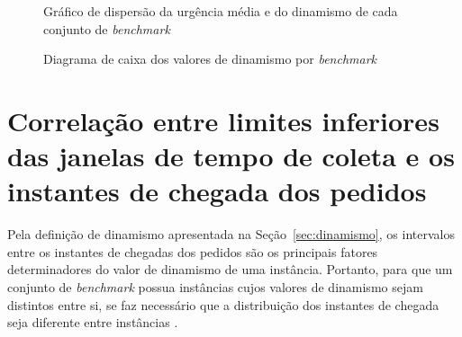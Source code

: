 \begin{figure}[H]
    \centering
    \caption{Gráfico de dispersão da urgência média e do dinamismo de cada 
    conjunto de \textit{benchmark}}
    \label{fig:scatterplot_instance_planing_horizon}
\end{figure}

\begin{figure}[H]
    \centering
    \caption{Diagrama de caixa dos valores de dinamismo por \textit{benchmark}}
    \label{fig:dynamism_boxplot_planing_horizon}
\end{figure}





\section{Correlação entre limites inferiores das janelas de tempo de coleta e
os instantes de chegada dos pedidos}

Pela definição de dinamismo apresentada na Seção~\ref{sec:dinamismo}, os 
intervalos entre os instantes de chegadas dos pedidos são os principais fatores
determinadores do valor de dinamismo de uma instância.
Portanto, para que um conjunto de \textit{benchmark} possua instâncias cujos 
valores de dinamismo sejam distintos entre si, se faz necessário que a 
distribuição dos instantes de chegada seja diferente entre instâncias 
\cite{van_lon_measures_2016}.

